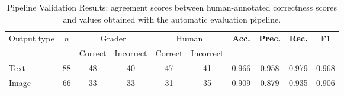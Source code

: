\begin{table}[t]
\caption{Pipeline Validation Results: agreement scores between human-annotated correctness scores and values obtained with the automatic evaluation pipeline.}
\label{tab:pipeline_validation}
\centering
\small
\begin{tabular}{lccccccccc}
\toprule
Output type & $n$ & \multicolumn{2}{c}{Grader} & \multicolumn{2}{c}{Human} & \textbf{Acc.} & \textbf{Prec.} & \textbf{Rec.} & \textbf{F1} \\
\cmidrule(lr){3-4}\cmidrule(lr){5-6}
 & & Correct & Incorrect & Correct & Incorrect & & & &  \\
\midrule
Text & 88 & 48 & 40 & 47 & 41 & 0.966 & 0.958 & 0.979 & 0.968 \\
Image & 66 & 33 & 33 & 31 & 35 & 0.909 & 0.879 & 0.935 & 0.906 \\
\bottomrule
\end{tabular}
\end{table}

